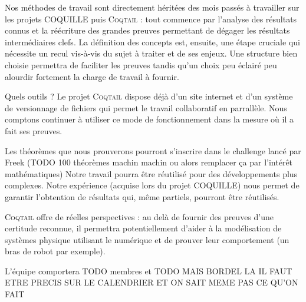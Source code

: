 \documentclass[11pt]{article}
\newcommand{\coqtail}{\textsc{Coqtail}}
\begin{document}
Nos méthodes de travail sont directement héritées des mois passés à travailler sur les projets COQUILLE puis \coqtail{} : tout commence par l'analyse des résultats connus et la réécriture des grandes preuves permettant de dégager les résultats intermédiaires clefs. La définition des concepts est, ensuite, une étape cruciale qui nécessite un recul vis-à-vis du sujet à traiter et de ses enjeux. Une structure bien choisie permettra de faciliter les preuves tandis qu'un choix peu éclairé peu alourdir fortement la charge de travail à fournir.

Quels outils ?
Le projet \coqtail{} dispose déjà d'un site internet\cite{coqtail} et d'un système de versionnage de fichiers qui permet le travail collaboratif en parrallèle. Nous comptons continuer à utiliser ce mode de fonctionnement dans la mesure où il a fait ses preuves.


Les théorèmes que nous prouverons pourront s'inscrire dans le challenge lancé par Freek (TODO 100 théorèmes machin machin ou alors remplacer ça par l'intérêt mathématiques) Notre travail pourra être réutilisé pour des développements plus complexes. Notre expérience (acquise lors du projet COQUILLE) nous permet de garantir l'obtention de résultats qui, même partiels, pourront être réutilisés.


\coqtail{} offre de réelles perspectives : au delà de fournir des preuves d'une certitude reconnue, %
il permettra potentiellement d'aider à la modélisation de systèmes physique utilisant le numérique et de prouver leur comportement (un bras de robot par exemple). %

L'équipe comportera TODO membres et TODO MAIS BORDEL LA IL FAUT ETRE PRECIS SUR LE CALENDRIER ET ON SAIT MEME PAS CE QU'ON FAIT

\printbibliography
\end{document}
